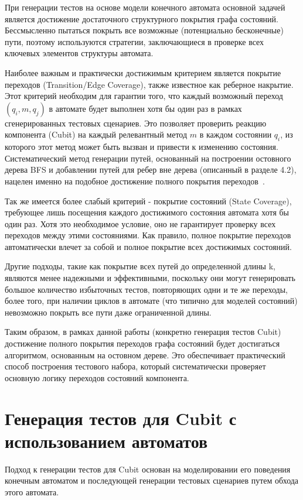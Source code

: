\documentclass[14pt, russian]{scrartcl}
\begin{document}
При генерации тестов на основе модели конечного автомата основной задачей является достижение достаточного структурного покрытия графа состояний. Бессмысленно пытаться покрыть все возможные (потенциально бесконечные) пути, поэтому используются стратегии, заключающиеся в проверке всех ключевых элементов структуры автомата.

Наиболее важным и практически достижимым критерием является покрытие переходов (Transition/Edge Coverage), также известное как реберное накрытие. Этот критерий необходим для гарантии того, что каждый возможный переход $(q_i, m, q_j)$ в автомате будет выполнен хотя бы один раз в рамках сгенерированных тестовых сценариев. Это позволяет проверить реакцию компонента (Cubit) на каждый релевантный метод $m$ в каждом состоянии $q_i$, из которого этот метод может быть вызван и привести к изменению состояния. Систематический метод генерации путей, основанный на построении остовного дерева BFS и добавлении путей для ребер вне дерева (описанный в разделе 4.2), нацелен именно на подобное достижение полного покрытия переходов~\cite{Karhumaki1992}.

Так же имеется более слабый критерий - покрытие состояний (State Coverage), требующее лишь посещения каждого достижимого состояния автомата хотя бы один раз. Хотя это необходимое условие, оно не гарантирует проверку всех переходов между этими состояниями. Как правило, полное покрытие переходов автоматически влечет за собой и полное покрытие всех достижимых состояний.

Другие подходы, такие как покрытие всех путей до определенной длины k, являются менее надежными и эффективными, поскольку они могут генерировать большое количество избыточных тестов, повторяющих одни и те же переходы, более того, при наличии циклов в автомате (что типично для моделей состояний) невозможно покрыть все пути даже ограниченной длины.

Таким образом, в рамках данной работы (конкретно генерация тестов Cubit) достижение полного покрытия переходов графа состояний будет достигаться алгоритмом, основанным на остовном дереве. Это обеспечивает практический способ построения тестового набора, который систематически проверяет основную логику переходов состояний компонента.


\section{Генерация тестов для Cubit с использованием автоматов}

Подход к генерации тестов для Cubit основан на моделировании его поведения конечным автоматом и последующей генерации тестовых сценариев путем обхода этого автомата.
\end{document}
